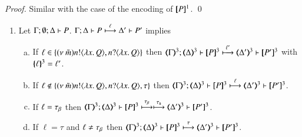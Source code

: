 \else 
\begin{proof}
Similar with the case of the encoding of $[\!\![P]\!\!]^{1}$. 
	\qed
\end{proof}
\fi

\begin{proposition}\rm
	\label{prop:op_corr_HOpp_to_HOp}
	\begin{enumerate}
		\item	Let $\Gamma; \emptyset; \Delta \vdash P$.
			$\Gamma; \Delta \vdash P \stackrel{\ell}{\longmapsto} \Delta' \vdash P'$ implies
%
			\begin{enumerate}[a)]
				\item	If $\ell \in \{(\nu\ \tilde{m}) n ! \langle \lambda x.\,Q \rangle, n ? \langle \lambda x.\,Q \rangle\}$ then
					$\horel{\tmap{\Gamma}{3}}{\tmap{\Delta}{3}}{\pmap{P}{3}}{\hby{\ell'}}
					{\tmap{\Delta'}{3}}{\pmap{P'}{3}}$ with $\{\!\!\{\ell\}\!\!\}^{3} = \ell'$.

%
%

				\item	If $\ell \notin \{(\nu\ \tilde{m}) n ! \langle \lambda x.\,Q \rangle, n ? \langle \lambda x.\,Q \rangle, \tau\}$ then
					$\horel{\tmap{\Gamma}{3}}{\tmap{\Delta}{3}}{\pmap{P}{3}}{\hby{\ell}}
					{\tmap{\Delta'}{3}}{\pmap{P'}{3}}$.

				\item	If $\ell = \tau_{\beta}$ then
					$\horel{\tmap{\Gamma}{3}}{\tmap{\Delta}{3}}{\pmap{P}{3}}{\hby{\btau} \hby{\stau}}
					{\tmap{\Delta'}{3}}{\pmap{P'}{3}}$.

				\item	If $\ell = \tau$ and $\ell \not= \tau_{\beta}$ then %
					$\horel{\tmap{\Gamma}{3}}{\tmap{\Delta}{3}}{\pmap{P}{3}}{\hby{\tau}}
					{\tmap{\Delta'}{3}}{\pmap{P'}{3}}$.
			\end{enumerate}


\end{enumerate}
\end{proposition}

